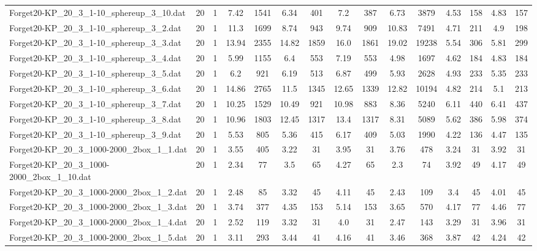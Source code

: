 \begin{table}[!ht]
{\begin{tabular}{lcccccccccccccc}
Forget20-KP\_20\_3\_1-10\_sphereup\_3\_10.dat & 20 & 1 & 7.42 & 1541 & 6.34 & 401 & 7.2 & 387 & 6.73 & 3879 & 4.53 & 158 & 4.83 & 157 \\
Forget20-KP\_20\_3\_1-10\_sphereup\_3\_2.dat & 20 & 1 & 11.3 & 1699 & 8.74 & 943 & 9.74 & 909 & 10.83 & 7491 & 4.71 & 211 & 4.9 & 198 \\
Forget20-KP\_20\_3\_1-10\_sphereup\_3\_3.dat & 20 & 1 & 13.94 & 2355 & 14.82 & 1859 & 16.0 & 1861 & 19.02 & 19238 & 5.54 & 306 & 5.81 & 299 \\
Forget20-KP\_20\_3\_1-10\_sphereup\_3\_4.dat & 20 & 1 & 5.99 & 1155 & 6.4 & 553 & 7.19 & 553 & 4.98 & 1697 & 4.62 & 184 & 4.83 & 184 \\
Forget20-KP\_20\_3\_1-10\_sphereup\_3\_5.dat & 20 & 1 & 6.2 & 921 & 6.19 & 513 & 6.87 & 499 & 5.93 & 2628 & 4.93 & 233 & 5.35 & 233 \\
Forget20-KP\_20\_3\_1-10\_sphereup\_3\_6.dat & 20 & 1 & 14.86 & 2765 & 11.5 & 1345 & 12.65 & 1339 & 12.82 & 10194 & 4.82 & 214 & 5.1 & 213 \\
Forget20-KP\_20\_3\_1-10\_sphereup\_3\_7.dat & 20 & 1 & 10.25 & 1529 & 10.49 & 921 & 10.98 & 883 & 8.36 & 5240 & 6.11 & 440 & 6.41 & 437 \\
Forget20-KP\_20\_3\_1-10\_sphereup\_3\_8.dat & 20 & 1 & 10.96 & 1803 & 12.45 & 1317 & 13.4 & 1317 & 8.31 & 5089 & 5.62 & 386 & 5.98 & 374 \\
Forget20-KP\_20\_3\_1-10\_sphereup\_3\_9.dat & 20 & 1 & 5.53 & 805 & 5.36 & 415 & 6.17 & 409 & 5.03 & 1990 & 4.22 & 136 & 4.47 & 135 \\
Forget20-KP\_20\_3\_1000-2000\_2box\_1\_1.dat & 20 & 1 & 3.55 & 405 & 3.22 & 31 & 3.95 & 31 & 3.76 & 478 & 3.24 & 31 & 3.92 & 31 \\
Forget20-KP\_20\_3\_1000-2000\_2box\_1\_10.dat & 20 & 1 & 2.34 & 77 & 3.5 & 65 & 4.27 & 65 & 2.3 & 74 & 3.92 & 49 & 4.17 & 49 \\
Forget20-KP\_20\_3\_1000-2000\_2box\_1\_2.dat & 20 & 1 & 2.48 & 85 & 3.32 & 45 & 4.11 & 45 & 2.43 & 109 & 3.4 & 45 & 4.01 & 45 \\
Forget20-KP\_20\_3\_1000-2000\_2box\_1\_3.dat & 20 & 1 & 3.74 & 377 & 4.35 & 153 & 5.14 & 153 & 3.65 & 570 & 4.17 & 77 & 4.46 & 77 \\
Forget20-KP\_20\_3\_1000-2000\_2box\_1\_4.dat & 20 & 1 & 2.52 & 119 & 3.32 & 31 & 4.0 & 31 & 2.47 & 143 & 3.29 & 31 & 3.96 & 31 \\
Forget20-KP\_20\_3\_1000-2000\_2box\_1\_5.dat & 20 & 1 & 3.11 & 293 & 3.44 & 41 & 4.16 & 41 & 3.46 & 368 & 3.87 & 42 & 4.24 & 42 \\

\end{tabular}}
\end{table}
